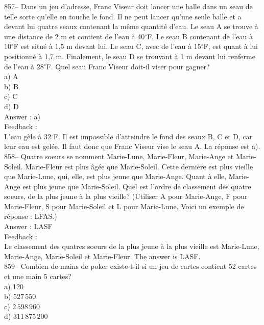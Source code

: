 ﻿\documentclass[letterpaper, 12pt]{article}
\begin{document}
857-- Dans un jeu d'adresse, Franc Viseur doit lancer une balle dans
un seau de telle sorte qu'elle en touche le fond.  Il ne peut lancer
qu'une seule balle et a devant lui quatre seaux contenant la m\^eme
quantit\'e d'eau.  Le seau A se trouve \`a une distance de 2 m et
contient de l'eau \`a 40$^{\circ}$F.  Le seau B contenant de l'eau
\`a 10$^{\circ}$F est situ\'e \`a 1,5 m devant lui.  Le seau C, avec
de l'eau \`a 15$^{\circ}$F, est quant \`a lui positionn\'e \`a 1,7
m. Finalement, le seau D se trouvant \`a 1 m devant lui renferme de
l'eau \`a 28$^{\circ}$F.
Quel seau Franc Viseur doit-il viser pour gagner?\\
a) A\\
b) B\\
c) C\\
d) D\\

Answer : a)\\

Feedback : \\
L'eau g\`ele \`a 32$^{\circ}$F.  Il est impossible d'atteindre le fond des
seaux B, C et D,
car leur eau est gel\'ee.  Il faut donc que Franc Viseur vise le seau A. La
r\'eponse est a).\\

858-- Quatre soeurs se nomment Marie-Lune, Marie-Fleur, Marie-Ange
et Marie-Soleil.  Marie-Fleur est plus \^ag\'ee que Marie-Soleil.
Cette derni\`ere est plus vieille que Marie-Lune, qui, elle, est
plus jeune que Marie-Ange.  Quant \`a elle, Marie-Ange est plus
jeune que Marie-Soleil. Quel est l'ordre de classement des quatre
soeurs, de la plus jeune \`a la plus vieille? (Utiliser A pour
Marie-Ange, F pour Marie-Fleur, S pour Marie-Soleil et L pour
Marie-Lune.
Voici un exemple de r\'eponse : LFAS.)\\

Answer : LASF\\

Feedback : \\
Le classement des quatres soeurs de la plus jeune \`a la plus vieille est
Marie-Lune, Marie-Ange, Marie-Soleil et Marie-Fleur.  The answer is
LASF.\\


859-- Combien de mains de poker existe-t-il si un jeu de cartes contient 52
cartes et une main 5 cartes?\\
a) 120\\
b) $527\,550$\\
c) $2\,598\,960$\\
d) $311\,875\,200$\\
\end{document}
